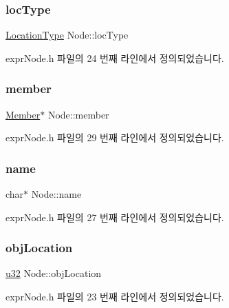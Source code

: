\subsubsection{\texorpdfstring{loc\+Type}{locType}}
{\footnotesize\ttfamily \mbox{\hyperlink{elf_8h_af2e75a10adf1443b5204c7856bbf630d}{Location\+Type}} Node\+::loc\+Type}



expr\+Node.\+h 파일의 24 번째 라인에서 정의되었습니다.

\mbox{\label{struct_node_aa221d21bde05ecda9cca447fdd550ca0}} 
\subsubsection{\texorpdfstring{member}{member}}
{\footnotesize\ttfamily \mbox{\hyperlink{struct_member}{Member}}$\ast$ Node\+::member}



expr\+Node.\+h 파일의 29 번째 라인에서 정의되었습니다.

\mbox{\label{struct_node_a059a0ea6f86dce9fd919c08a707b360b}} 
\subsubsection{\texorpdfstring{name}{name}}
{\footnotesize\ttfamily char$\ast$ Node\+::name}



expr\+Node.\+h 파일의 27 번째 라인에서 정의되었습니다.

\mbox{\label{struct_node_ab16254ec466168164ba6e5790396c3cc}} 
\subsubsection{\texorpdfstring{obj\+Location}{objLocation}}
{\footnotesize\ttfamily \mbox{\hyperlink{_system_8h_a10e94b422ef0c20dcdec20d31a1f5049}{u32}} Node\+::obj\+Location}



expr\+Node.\+h 파일의 23 번째 라인에서 정의되었습니다.

\mbox{\label{struct_node_a8023bbc1d73f9273930ef05ef20f7404}} 
